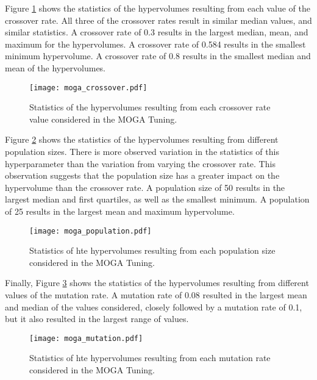 Figure \ref{fig:moga_crossover} shows the statistics of the hypervolumes 
resulting from each value of the crossover rate. All three of the 
crossover rates result in similar median values, and similar statistics. 
A crossover rate of 
0.3 results in the largest median, mean, and maximum for the 
hypervolumes. A crossover rate of 0.584 results in the smallest minimum 
hypervolume. A crossover rate of 0.8 results in the smallest median 
and mean of the hypervolumes. 

\begin{figure}
    \centering 
    \texttt{[image: moga\_crossover.pdf]}
    \caption{Statistics of the hypervolumes resulting from each 
    crossover rate value considered in the MOGA Tuning.}
    \label{fig:moga_crossover}
\end{figure}

Figure \ref{fig:moga_population} shows the statistics of the hypervolumes 
resulting from different population sizes. There is more observed variation 
in the statistics of this hyperparameter than the variation from varying 
the crossover rate. This observation suggests that the population size has 
a greater impact on the hypervolume than the crossover rate. A population 
size of 50 results in the largest median and first quartiles, as well 
as the smallest minimum. A population of 25 results in the largest mean 
and maximum hypervolume. 

\begin{figure}
    \centering 
    \texttt{[image: moga\_population.pdf]}
    \caption{Statistics of hte hypervolumes resulting from 
    each population size considered in the MOGA Tuning.}
    \label{fig:moga_population}
\end{figure}

Finally, Figure \ref{fig:moga_mutation} shows the statistics of the 
hypervolumes resulting from different values of the mutation rate.
A mutation rate of 0.08 resulted in the largest mean and median of the 
values considered, closely followed by a mutation rate of 0.1, but it 
also resulted in the largest range of values. 


\begin{figure}
    \centering 
    \texttt{[image: moga\_mutation.pdf]}
    \caption{Statistics of hte hypervolumes resulting from 
    each mutation rate considered in the MOGA Tuning.}
    \label{fig:moga_mutation}
\end{figure}

